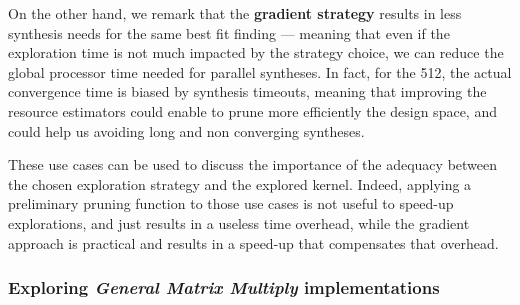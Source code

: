                 On the other hand, we remark that the {\bf gradient strategy} results in less synthesis needs for the same best fit finding --- meaning that even if the exploration time is not much impacted by the strategy choice, we can reduce the global processor time needed for parallel syntheses.
                In fact, for the 512, the actual convergence time is biased by synthesis timeouts, meaning that improving the resource estimators could enable to prune more efficiently the design space, and could help us avoiding long and non converging syntheses.%

                These use cases can be used to discuss the importance of the adequacy between the chosen exploration strategy and the explored kernel.
                Indeed, applying a preliminary pruning function to those use cases is not useful to speed-up explorations, and just results in a useless time overhead, while the gradient approach is practical and results in a speed-up that compensates that overhead.

            \subsubsection{Exploring {\it General Matrix Multiply} implementations}

